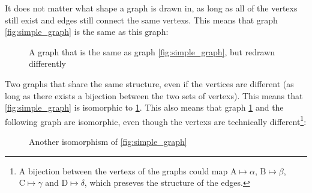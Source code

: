     It does not matter what shape a graph is drawn in, as long as all of the \glspl{vertex} still exist and \glspl{edge} still connect the same \glspl{vertex}.
    This means that \gls{graph} \ref{fig:simple_graph} is the same as this graph:

    \begin{figure}
        \centering
        \caption{A \gls{graph} that is the same as \gls{graph} \ref{fig:simple_graph}, but redrawn differently}
        \label{fig:redrawn_graph}
    \end{figure}

    Two graphs that share the same structure, even if the vertices are different (as long as there exists a bijection between the two sets of \glspl{vertex}).
    This means that \ref{fig:simple_graph} is isomorphic to \ref{fig:redrawn_graph}.
    This also means that \gls{graph} \ref{fig:redrawn_graph} and the following \gls{graph} are isomorphic, even though the \glspl{vertex} are technically different\footnote{A bijection between the \glspl{vertex} of the \glspl{graph} could map $\text{A}\mapsto\alpha$, $\text{B}\mapsto\beta$, $\text{C}\mapsto\gamma$ and $\text{D}\mapsto\delta$, which preseves the structure of the \glspl{edge}.}:

    \begin{figure}
        \centering
        \caption{Another isomorphism of \ref{fig:simple_graph}}
    \end{figure}

